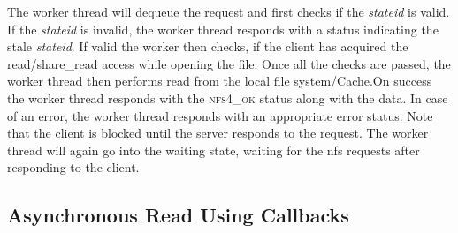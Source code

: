 The worker thread will dequeue the request and first checks if the \textit{stateid} is valid. If the \textit{stateid} is invalid, the worker thread responds with a status indicating the stale \textit{stateid}. If valid the worker then checks, if the client has acquired the read/share\_read access while opening the file. Once all the checks are passed, the worker thread then performs read from the local file system/Cache.On success the worker thread responds with the \textsc{nfs4\_ok} status along with the data. In case of an error, the worker thread responds with an appropriate error status. Note that the client is blocked until the server responds to the request. The worker thread will again go into the waiting state, waiting for the nfs requests after responding to the client.


\subsection{Asynchronous Read Using Callbacks}

